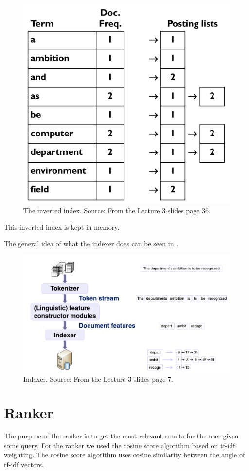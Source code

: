 	\begin{figure}[H]
	\centering
	\includegraphics[width=0.7\linewidth]{./Media/InvertedIndex}
	\caption{The inverted index. Source: From the Lecture 3 slides page 36.}
	\label{fig:InvertedIndex}
	\end{figure}
	
	This inverted index is kept in memory.
	
	The general idea of what the indexer does can be seen in .
	
	\begin{figure}[H]
	\centering
	\includegraphics[width=0.7\linewidth]{./Media/indexer}
	\caption{Indexer. Source: From the Lecture 3 slides page 7.}
	\label{fig:indexer}
	\end{figure}
	
	\section{Ranker}
	The purpose of the ranker is to get the most relevant results for the user given some query.
	For the ranker we used the cosine score algorithm based on tf-idf weighting.
	The cosine score algorithm uses cosine similarity between the angle of tf-idf vectors.
	

